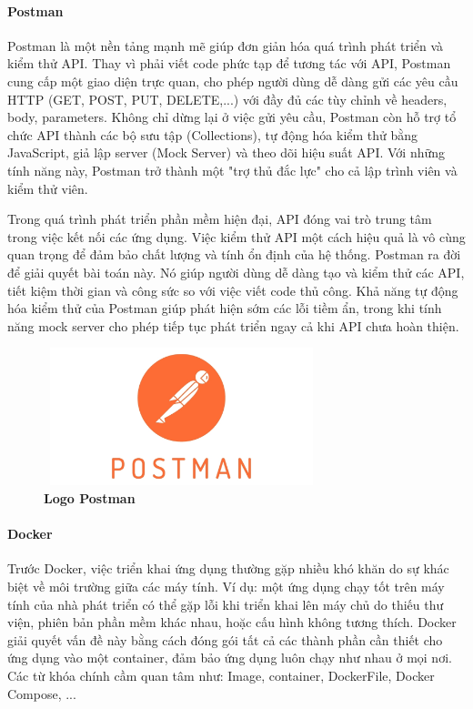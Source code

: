 \paragraph{Postman}
\mbox{}

Postman là một nền tảng mạnh mẽ giúp đơn giản hóa quá trình phát triển và kiểm thử API. Thay vì phải viết code phức tạp để tương tác với API, Postman cung cấp một giao diện trực quan, cho phép người dùng dễ dàng gửi các yêu cầu HTTP (GET, POST, PUT, DELETE,...) với đầy đủ các tùy chỉnh về headers, body, parameters. Không chỉ dừng lại ở việc gửi yêu cầu, Postman còn hỗ trợ tổ chức API thành các bộ sưu tập (Collections), tự động hóa kiểm thử bằng JavaScript, giả lập server (Mock Server) và theo dõi hiệu suất API. Với những tính năng này, Postman trở thành một "trợ thủ đắc lực" cho cả lập trình viên và kiểm thử viên.

Trong quá trình phát triển phần mềm hiện đại, API đóng vai trò trung tâm trong việc kết nối các ứng dụng. Việc kiểm thử API một cách hiệu quả là vô cùng quan trọng để đảm bảo chất lượng và tính ổn định của hệ thống. Postman ra đời để giải quyết bài toán này. Nó giúp người dùng dễ dàng tạo và kiểm thử các API, tiết kiệm thời gian và công sức so với việc viết code thủ công. Khả năng tự động hóa kiểm thử của Postman giúp phát hiện sớm các lỗi tiềm ẩn, trong khi tính năng mock server cho phép tiếp tục phát triển ngay cả khi API chưa hoàn thiện.

\begin{figure}[H]
  \centering
  \includegraphics[width=8cm,height=4cm]{Images/Technology/postman.jpg}
  \caption[Logo Postman]{\bfseries \fontsize{12pt}{0pt}
  \selectfont Logo Postman}
  \label{postman} %
\end{figure}


\paragraph{Docker}
\mbox{}

Trước Docker, việc triển khai ứng dụng thường gặp nhiều khó khăn do sự khác biệt về môi trường giữa các máy tính. Ví dụ: một ứng dụng chạy tốt trên máy tính của nhà phát triển có thể gặp lỗi khi triển khai lên máy chủ do thiếu thư viện, phiên bản phần mềm khác nhau, hoặc cấu hình không tương thích. Docker giải quyết vấn đề này bằng cách đóng gói tất cả các thành phần cần thiết cho ứng dụng vào một container, đảm bảo ứng dụng luôn chạy như nhau ở mọi nơi. Các từ khóa chính cầm quan tâm như: Image, container, DockerFile, Docker Compose, ...

